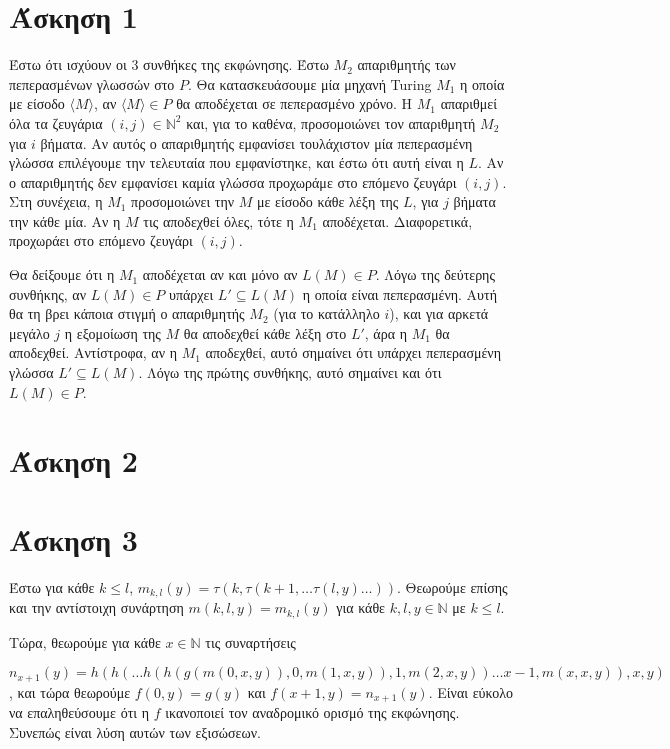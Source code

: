 \documentclass[a4paper, oneside, 11pt]{article}
\theoremstyle{definition}
\begin{document}


\section*{Άσκηση 1}
Έστω ότι ισχύουν οι 3 συνθήκες της εκφώνησης. Έστω $M_2$ απαριθμητής των πεπερασμένων γλωσσών στο $P$. Θα κατασκευάσουμε μία μηχανή Turing $M_1$ η οποία
με είσοδο $\langle M\rangle$, αν $\langle M\rangle\in P$ θα αποδέχεται σε πεπερασμένο χρόνο. Η $M_1$ απαριθμεί όλα τα ζευγάρια
$(i,j)\in \mathbb{N}^2$ και, για το καθένα, προσομοιώνει τον απαριθμητή $M_2$ για $i$ βήματα. Αν αυτός ο απαριθμητής εμφανίσει τουλάχιστον μία
πεπερασμένη γλώσσα επιλέγουμε την τελευταία που εμφανίστηκε, και έστω ότι αυτή είναι η $L$. Αν ο απαριθμητής δεν εμφανίσει καμία γλώσσα προχωράμε στο
επόμενο ζευγάρι $(i,j)$. Στη συνέχεια, η $M_1$ προσομοιώνει την $M$ με είσοδο κάθε λέξη της $L$, για $j$ βήματα την κάθε μία. Αν η $M$ τις αποδεχθεί
όλες, τότε η $M_1$ αποδέχεται. Διαφορετικά, προχωράει στο επόμενο ζευγάρι $(i,j)$.

Θα δείξουμε ότι η $M_1$ αποδέχεται αν και μόνο αν $L(M)\in P$. Λόγω της δεύτερης συνθήκης, αν $L(M)\in P$
υπάρχει $L'\subseteq L(M)$ η οποία είναι πεπερασμένη.
Αυτή θα τη βρει κάποια στιγμή ο απαριθμητής $M_2$ (για το κατάλληλο $i$), και για αρκετά μεγάλο $j$ η εξομοίωση της $M$ θα αποδεχθεί κάθε λέξη
στο $L'$, άρα η $M_1$ θα αποδεχθεί. Αντίστροφα, αν η $M_1$ αποδεχθεί, αυτό σημαίνει ότι υπάρχει πεπερασμένη γλώσσα $L'\subseteq L(M)$. Λόγω της πρώτης
συνθήκης, αυτό σημαίνει και ότι $L(M)\in P$.

\section*{Άσκηση 2}
\section*{Άσκηση 3}
Έστω για κάθε $k\leq l$, 
$m_{k,l}(y)=\tau(k,\tau(k+1,\dots\tau(l,y)\dots))$. Θεωρούμε επίσης και την αντίστοιχη συνάρτηση $m(k,l,y)=m_{k,l}(y)$ για κάθε $k,l,y\in \mathbb{N}$ με $k\leq l$.

Τώρα, θεωρούμε για κάθε $x\in \mathbb{N}$ τις συναρτήσεις 

$n_{x+1}(y)=h(h(\dots h(h(g(m(0,x,y)),0,m(1,x,y)),1,m(2,x,y))\dots x-1,m(x,x,y)),x,y)$, και τώρα θεωρούμε
$f(0,y)=g(y)$ και $f(x+1,y)=n_{x+1}(y)$. Είναι εύκολο να επαληθεύσουμε ότι η $f$ ικανοποιεί τον αναδρομικό ορισμό της εκφώνησης. Συνεπώς είναι λύση αυτών των εξισώσεων.
\end{document}
